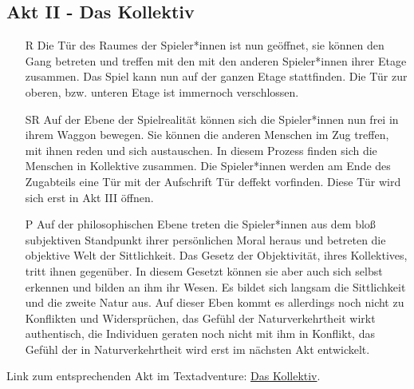 \documentclass[12pt, a4paper, openany]{report}
\begin{document}
\subsection{Akt II - Das Kollektiv}
\begin{itemize}
\item[R] Die Tür des Raumes der Spieler*innen ist nun geöffnet, sie können den Gang betreten und treffen mit den mit den anderen Spieler*innen ihrer Etage zusammen.
Das Spiel kann nun auf der ganzen Etage stattfinden. 
Die Tür zur oberen, bzw. unteren Etage ist immernoch verschlossen.
\item[SR] Auf der Ebene der Spielrealität können sich die Spieler*innen nun frei in ihrem Waggon bewegen. 
Sie können die anderen Menschen im Zug treffen, mit ihnen reden und sich austauschen. 
In diesem Prozess finden sich die Menschen in Kollektive zusammen.
Die Spieler*innen werden am Ende des Zugabteils eine Tür mit der Aufschrift \glqq Tür deffekt\grqq{} vorfinden.
Diese Tür wird sich erst in Akt III öffnen.
\item[P] Auf der philosophischen Ebene treten die Spieler*innen aus dem bloß subjektiven Standpunkt ihrer persönlichen Moral heraus und betreten die objektive Welt der Sittlichkeit.
Das Gesetz der Objektivität, ihres Kollektives, tritt ihnen gegenüber.
In diesem Gesetzt können sie aber auch sich selbst erkennen und bilden an ihm ihr Wesen. 
Es bildet sich langsam die Sittlichkeit und die zweite Natur aus.
Auf dieser Eben kommt es allerdings noch nicht zu Konflikten und Widersprüchen, das Gefühl der Naturverkehrtheit wirkt authentisch, die Individuen geraten noch nicht mit ihm in Konflikt, das Gefühl der in Naturverkehrtheit wird erst im nächsten Akt entwickelt.
\end{itemize}
Link zum entsprechenden Akt im Textadventure: \hyperref[das-kollektiv]{Das Kollektiv}.
\end{document}
